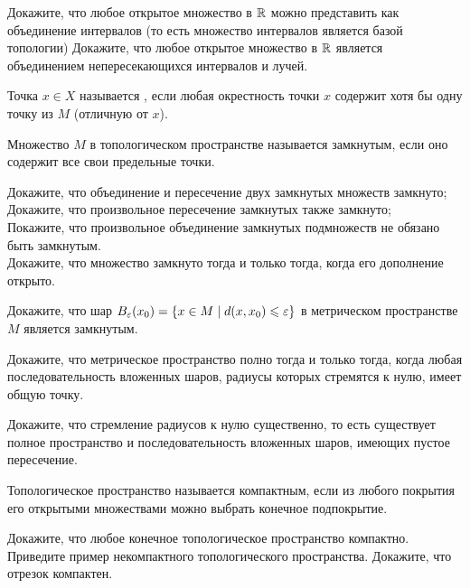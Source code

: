 \documentclass[a4paper,12pt]{article}
\begin{document}
    Докажите, что любое открытое множество в $\mathbb{R}$ можно представить как объединение интервалов (то есть множество интервалов является  базой топологии)
    Докажите, что любое открытое множество в $\mathbb{R}$ является объединением непересекающихся интервалов и лучей.


Точка $x\in X$ называется , если любая окрестность точки $x$ содержит хотя бы одну точку из $M$ (отличную от $x$).

Множество $M$ в топологическом пространстве называется  замкнутым, если оно содержит все свои предельные точки.

    Докажите, что объединение и пересечение двух замкнутых множеств замкнуто;
    \\
    Докажите, что произвольное пересечение замкнутых также замкнуто;
    \\
    Покажите, что произвольное объединение замкнутых подмножеств не обязано быть замкнутым.
    \\
    Докажите, что множество замкнуто тогда и только тогда, когда его дополнение открыто.

\vfill
{}
\newpage

    Докажите, что шар $B_\varepsilon(x_0)=\left\{x\in M\mid d(x,x_0)\leqslant\varepsilon\right\}$ в метрическом пространстве $M$ является замкнутым.


    Докажите, что метрическое пространство полно тогда и только тогда, когда любая последовательность вложенных шаров, радиусы которых стремятся к нулю, имеет общую точку.

    Докажите, что стремление радиусов к нулю существенно, то есть существует полное пространство и последовательность вложенных шаров, имеющих пустое пересечение.\\


    Топологическое пространство называется  компактным, если из любого покрытия его открытыми множествами можно выбрать конечное подпокрытие.


    Докажите, что любое конечное топологическое пространство компактно.
    Приведите пример некомпактного топологического пространства.
    Докажите, что отрезок компактен.
\end{document}
